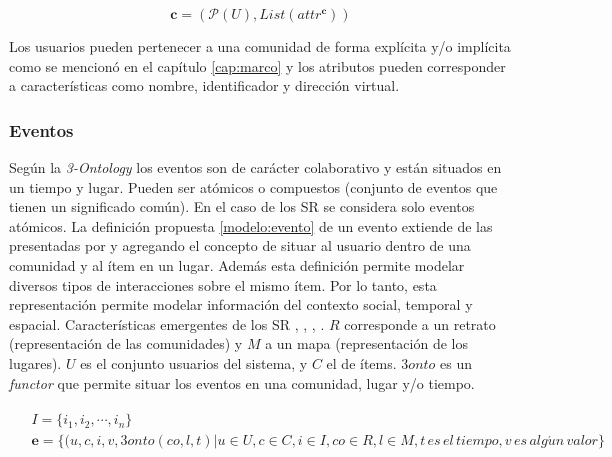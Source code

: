 \begin{equation}
\label{modelo:comunidad}
	\pmb{c} = (\mathcal{P}(U), List(attr^{\pmb{c}}))
\end{equation}

Los usuarios pueden pertenecer a una comunidad de forma explícita y/o implícita como se mencionó en el capítulo \ref{cap:marco} y los atributos pueden corresponder a características como nombre, identificador y dirección virtual.


\subsubsection{Eventos}


Según la \textit{3-Ontology} los eventos son de carácter colaborativo y están situados en un tiempo y lugar. Pueden ser atómicos o compuestos (conjunto de eventos que tienen un significado común). En el caso de los SR se considera solo eventos atómicos. La definición propuesta \eqref{modelo:evento} de un evento extiende de las presentadas por \cite{Babar:2010} y \cite{Palomino:2012} agregando el concepto de situar al usuario dentro de una comunidad y al ítem en un lugar. Además esta definición permite modelar diversos tipos de interacciones sobre el mismo ítem. Por lo tanto, esta representación permite modelar información del contexto  social, temporal y espacial. Características emergentes de los SR \citep{Adomavicius:2005}, \citep{Adomavicius:2011}, \citep{Palomino:2012}, \citep{Bobadilla:2013}. $R$ corresponde a un retrato (representación de las comunidades) y $M$ a un mapa (representación de los lugares). $U$ es el conjunto usuarios del sistema, y $C$ el de ítems. $3onto$ es un \textit{functor} que permite situar los eventos en una comunidad, lugar y/o tiempo.

\begin{equation}
\label{modelo:evento}
\begin{split}
\begin{aligned}
	&I = \{i_1, i_2,\cdots,i_n\}\\
	&\pmb{e} = \{(u, c, i, v, 3onto(co, l, t) | u\in U, c \in C, i \in I, co \in R, l \in M, t\, es\, el\, tiempo,v\, es\, alg\acute{u}n\, valor\}\\
\end{aligned}
\end{split}
\end{equation}

